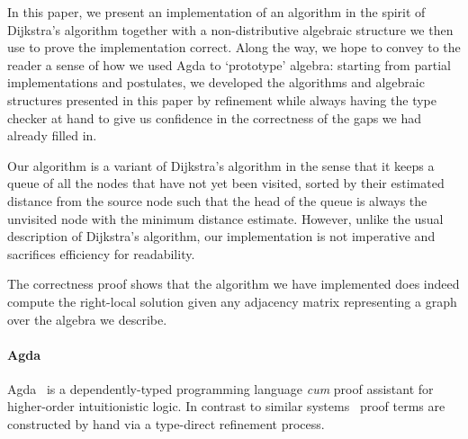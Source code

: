 

In this paper, we present an implementation of an algorithm in the spirit of Dijkstra's algorithm together with a non-distributive algebraic structure we then use to prove the implementation correct.
Along the way, we hope to convey to the reader a sense of how we used Agda to `prototype' algebra: starting from partial implementations and postulates, we developed the algorithms and algebraic structures presented in this paper by refinement while always having the type checker at hand to give us confidence in the correctness of the gaps we had already filled in.

Our algorithm is a variant of Dijkstra's algorithm in the sense that it keeps a queue of all the nodes that have not yet been visited, sorted by their estimated distance from the source node such that the head of the queue is always the unvisited node with the minimum distance estimate. However, unlike the usual description of Dijkstra's algorithm, our implementation is not imperative and sacrifices efficiency for readability.

The correctness proof shows that the algorithm we have implemented does indeed compute the right-local solution given any adjacency matrix representing a graph over the algebra we describe.

\paragraph{Agda}

Agda~\cite{norell_dependently_2009} is a dependently-typed programming language \emph{cum} proof assistant for higher-order intuitionistic logic.
In contrast to similar systems~\cite{bertot_short_2008,asperti_matita_2011} proof terms are constructed by hand via a type-direct refinement process.

